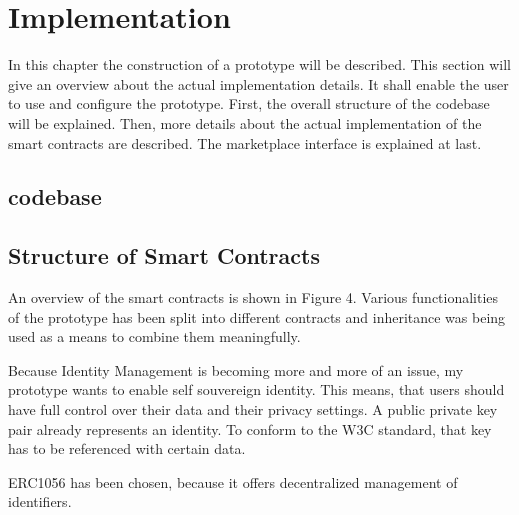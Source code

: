 \chapter{Implementation}
\label{cha:implementation}

In this chapter the construction of a prototype will be described. 
This section will give an overview about the actual implementation details. It shall enable the user to use and configure the prototype. First, the overall structure of the codebase will be explained. Then, more details about the actual implementation of the smart contracts are described. The marketplace interface is explained at last. 

\section{codebase}

\section{Structure of Smart Contracts}

An overview of the smart contracts is shown in Figure 4. Various functionalities of the prototype has been split into different contracts and  inheritance was being used as a means to combine them meaningfully. 
 
Because Identity Management is becoming more and more of an issue, my prototype wants to enable self souvereign identity. 
This means, that users should have full control over their data and their privacy settings. A public private key pair already represents an identity. To conform to the W3C standard, that key has to be referenced with certain data. 

ERC1056 has been chosen, because it offers decentralized management of identifiers. 

